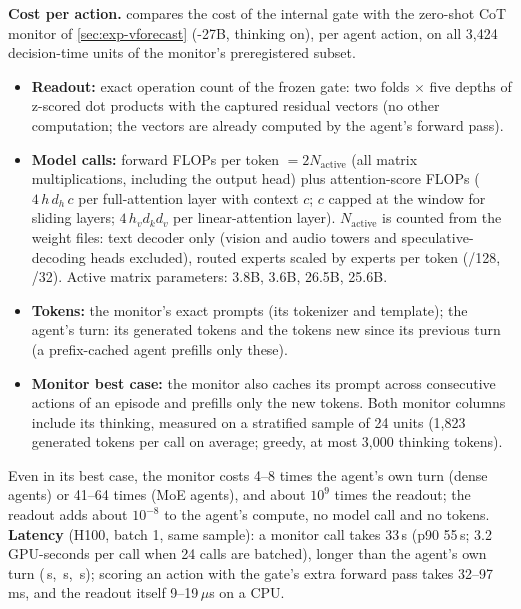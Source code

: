 \textbf{Cost per action.}\label{app:cost}
 compares the cost of the internal gate with the zero-shot CoT monitor of \cref{sec:exp-vforecast} (\Qwen-27B, thinking on), per agent action, on all 3{,}424 decision-time units of the monitor's preregistered subset.
\begin{itemize}
\item \textbf{Readout:} exact operation count of the frozen gate: two folds $\times$ five depths of z-scored dot products with the captured residual vectors (no other computation; the vectors are already computed by the agent's forward pass).
\item \textbf{Model calls:} forward FLOPs per token $=2N_{\text{active}}$ (all matrix multiplications, including the output head) plus attention-score FLOPs ($4\,h\,d_h\,c$ per full-attention layer with context $c$; $c$ capped at the window for sliding layers; $4\,h_v d_k d_v$ per linear-attention layer). $N_{\text{active}}$ is counted from the weight files: text decoder only (vision and audio towers and speculative-decoding heads excluded), routed experts scaled by experts per token (/128, /32). Active matrix parameters: \Gemma 3.8B, \Oss 3.6B, \Muse 26.5B, \Qwen 25.6B.
\item \textbf{Tokens:} the monitor's exact prompts (its tokenizer and template); the agent's turn: its generated tokens and the tokens new since its previous turn (a prefix-cached agent prefills only these).
\item \textbf{Monitor best case:} the monitor also caches its prompt across consecutive actions of an episode and prefills only the new tokens. Both monitor columns include its thinking, measured on a stratified sample of 24 units (1{,}823 generated tokens per call on average; greedy, at most 3{,}000 thinking tokens).
\end{itemize}
Even in its best case, the monitor costs 4--8 times the agent's own turn (dense agents) or 41--64 times (MoE agents), and about $10^{9}$ times the readout; the readout adds about $10^{-8}$ to the agent's compute, no model call and no tokens. \textbf{Latency} (H100, batch 1, same sample): a monitor call takes 33\,s (p90 55\,s; 3.2 GPU-seconds per call when 24 calls are batched), longer than the agent's own turn (\,s, \,s, \,s); scoring an action with the gate's extra forward pass takes 32--97\,ms, and the readout itself 9--19\,$\mu$s on a CPU.



